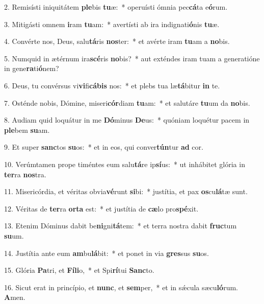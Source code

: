 2. Remisísti iniquitátem \textbf{ple}bis \textbf{tu}æ:~*  operuísti ómnia pec\textbf{cá}ta e\textbf{ó}rum.\

3. Mitigásti omnem \textbf{i}ram \textbf{tu}am:~*  avertísti ab ira indignati\textbf{ó}nis \textbf{tu}æ.\

4. Convérte nos, Deus, salu\textbf{tá}ris \textbf{nos}ter:~*  et avérte iram \textbf{tu}am a \textbf{no}bis.\

5. Numquid in ætérnum ira\textbf{scé}ris \textbf{no}bis?~*  aut exténdes iram tuam a generatióne in gene\textbf{ra}ti\textbf{ó}nem?\

6. Deus, tu convérsus vi\textbf{vi}fi\textbf{cá}\textbf{bis} nos:~*  et plebs tua læ\textbf{tá}bitur \textbf{in} te.\

7. Osténde nobis, Dómine, miseri\textbf{cór}diam \textbf{tu}am:~*  et salutáre \textbf{tu}um da \textbf{no}bis.\

8. Audiam quid loquátur in me \textbf{Dó}minus \textbf{De}us:~*  quóniam loquétur pacem in \textbf{ple}bem \textbf{su}am.\

9. Et super \textbf{sanc}tos \textbf{su}os:~*  et in eos, qui conver\textbf{tún}tur \textbf{ad} cor.\

10. Verúmtamen prope timéntes eum salu\textbf{tá}re ip\textbf{sí}us:~*  ut inhábitet glória in \textbf{ter}ra \textbf{nos}tra.\

11. Misericórdia, et véritas obvia\textbf{vé}runt \textbf{si}bi:~*  justítia, et pax \textbf{os}cu\textbf{lá}tæ sunt.\

12. Véritas de \textbf{ter}ra \textbf{or}\textbf{ta} est:~*  et justítia de \textbf{cæ}lo pro\textbf{spé}xit.\

13. Etenim Dóminus dabit be\textbf{ni}gni\textbf{tá}tem:~*  et terra nostra dabit \textbf{fruc}tum \textbf{su}um.\

14. Justítia ante eum \textbf{am}bu\textbf{lá}bit:~*  et ponet in via \textbf{gres}sus \textbf{su}os.\

15. Glória \textbf{Pa}tri, et \textbf{Fí}\textbf{li}o,~*  et Spi\textbf{rí}tui \textbf{Sanc}to.\

16. Sicut erat in princípio, et \textbf{nunc}, et \textbf{sem}per,~*  et in sǽcula sæcu\textbf{ló}rum. \textbf{A}men.\

